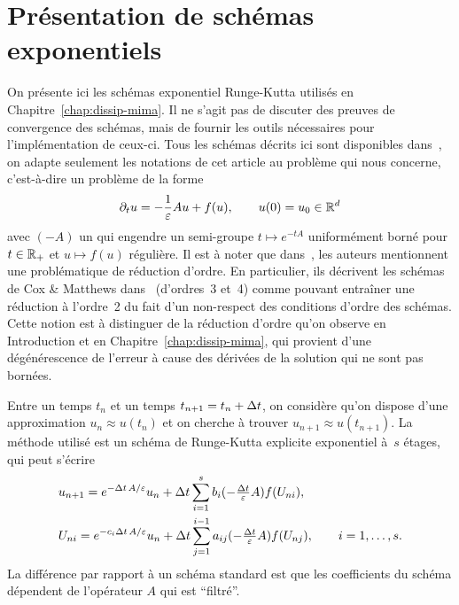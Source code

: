 
\chapter{Présentation de schémas exponentiels}
\label{chap:schemas}

On présente ici les schémas exponentiel Runge-Kutta utilisés en Chapitre~\ref{chap:dissip-mima}. Il ne s'agit pas de discuter des preuves de convergence des schémas, mais de fournir les outils nécessaires pour l'implémentation de ceux-ci. Tous les schémas décrits ici sont disponibles dans~\cite{hochbruck.2005.explicit}, on adapte seulement les notations de cet article au problème qui nous concerne, c'est-à-dire un problème de la forme
\begin{equation} \label{sch:pb:u}
    \partial_t u = -\frac{1}{\varepsilon} A u + f(u), 
    \qquad 
    u(0) = u_0 \in \mathbb{R}^d
\end{equation}
avec $(-A)$ un qui engendre un semi-groupe $t \mapsto e^{-tA}$ uniformément borné pour $t \in \mathbb{R}_+$ et $u \mapsto f(u)$ régulière. Il est à noter que dans~\cite{hochbruck.2005.explicit}, les auteurs mentionnent une problématique de réduction d'ordre. En particulier, ils décrivent les schémas de Cox \& Matthews dans~\cite{cox.2002.exponential} (d'ordres~3 et~4) comme pouvant entraîner une réduction à l'ordre~2 du fait d'un non-respect des conditions d'ordre des schémas. Cette notion est à distinguer de la réduction d'ordre qu'on observe en Introduction et en Chapitre~\ref{chap:dissip-mima}, qui provient d'une dégénérescence de l'erreur à cause des dérivées de la solution qui ne sont pas bornées.


Entre un temps $t_n$ et un temps $t_{n+1} = t_n + \Delta t$, on considère qu'on dispose d'une approximation $u_n \approx u(t_n)$ et on cherche à trouver $u_{n+1} \approx u(t_{n+1})$. La méthode utilisé est un schéma de Runge-Kutta explicite exponentiel à~$s$ étages, qui peut s'écrire
\begin{align*}
& u_{n+1} = e^{-\Delta t\, A/\varepsilon} u_n + \Delta t \sum_{i = 1}^s 
    b_i({\textstyle -\frac{\Delta t}{\varepsilon} A}) f(U_{ni}) ,
\\
& U_{ni} = e^{-c_i \Delta t\, A/\varepsilon} u_n + \Delta t \sum_{j = 1}^{i-1} 
    a_{ij}({\textstyle -\frac{\Delta t}{\varepsilon} A}) f(U_{nj}),
\qquad
  i = 1, \ldots, s .
\end{align*}
La différence par rapport à un schéma standard est que les coefficients du schéma dépendent de l'opérateur $A$ qui est \enquote{filtré}. 

